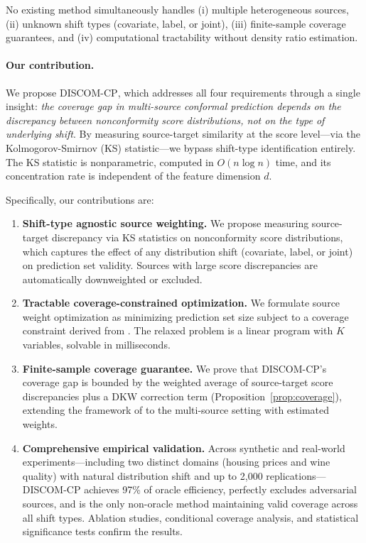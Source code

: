 \documentclass{article}
\newcommand{\DISCOM}{\textsc{DISCOM-CP}}
\begin{document}
No existing method simultaneously handles (i) multiple heterogeneous sources, (ii) unknown shift types (covariate, label, or joint), (iii) finite-sample coverage guarantees, and (iv) computational tractability without density ratio estimation.

\paragraph{Our contribution.}
We propose \DISCOM{}, which addresses all four requirements through a single insight: \emph{the coverage gap in multi-source conformal prediction depends on the discrepancy between nonconformity score distributions, not on the type of underlying shift}. By measuring source-target similarity at the score level---via the Kolmogorov-Smirnov (KS) statistic---we bypass shift-type identification entirely. The KS statistic is nonparametric, computed in $O(n \log n)$ time, and its concentration rate is independent of the feature dimension $d$.

Specifically, our contributions are:
\begin{enumerate}
\item \textbf{Shift-type agnostic source weighting.} We propose measuring source-target discrepancy via KS statistics on nonconformity score distributions, which captures the effect of any distribution shift (covariate, label, or joint) on prediction set validity. Sources with large score discrepancies are automatically downweighted or excluded.

\item \textbf{Tractable coverage-constrained optimization.} We formulate source weight optimization as minimizing prediction set size subject to a coverage constraint derived from \citet{barber2023conformal}. The relaxed problem is a linear program with $K$ variables, solvable in milliseconds.

\item \textbf{Finite-sample coverage guarantee.} We prove that \DISCOM{}'s coverage gap is bounded by the weighted average of source-target score discrepancies plus a DKW correction term (Proposition~\ref{prop:coverage}), extending the framework of \citet{barber2023conformal} to the multi-source setting with estimated weights.

\item \textbf{Comprehensive empirical validation.} Across synthetic and real-world experiments---including two distinct domains (housing prices and wine quality) with natural distribution shift and up to 2{,}000 replications---\DISCOM{} achieves 97\% of oracle efficiency, perfectly excludes adversarial sources, and is the only non-oracle method maintaining valid coverage across all shift types. Ablation studies, conditional coverage analysis, and statistical significance tests confirm the results.
\end{enumerate}
\end{document}
